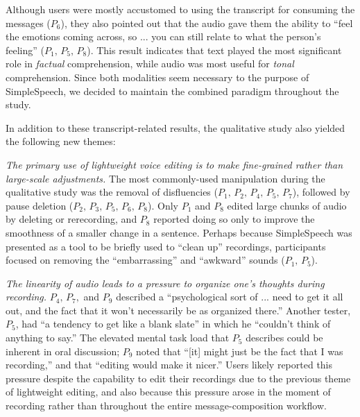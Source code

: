 Although users were mostly accustomed to using the transcript for consuming the messages ($P_6$), they also pointed out that the audio gave them the ability to ``feel the emotions coming across, so ... you can still relate to what the person’s feeling'' ($P_1,\,P_5,\,P_8$).
This result indicates that text played the most significant role in \emph{factual} comprehension, while audio was most useful for \emph{tonal} comprehension.
Since both modalities seem necessary to the purpose of SimpleSpeech, we decided to maintain the combined paradigm throughout the study.

In addition to these transcript-related results, the qualitative study also yielded the following new themes:

\emph{The primary use of lightweight voice editing is to make fine-grained rather than large-scale adjustments.}
The most commonly-used manipulation during the qualitative study was the removal of disfluencies ($P_1,\,P_2,\,P_4,\,P_5,\,P_7$), followed by pause deletion ($P_2,\,P_3,\,P_5,\,P_6,\,P_8$). 
Only $P_1$ and $P_8$ edited large chunks of audio by deleting or rerecording, and $P_8$ reported doing so only to improve the smoothness of a smaller change in a sentence.
Perhaps because SimpleSpeech was presented as a tool to be briefly used to ``clean up'' recordings, participants focused on removing the ``embarrassing'' and ``awkward'' sounds ($P_1,\,P_5$). 

\emph{The linearity of audio leads to a pressure to organize one's thoughts during recording.}
$P_4,\,P_7,$ and $P_9$ described a ``psychological sort of ... need to get it all out, and the fact that it won't necessarily be as organized there.'' 
Another tester, $P_5$, had ``a tendency to get like a blank slate'' in which he ``couldn't think of anything to say.'' 
The elevated mental task load that $P_5$ describes could be inherent in oral discussion; $P_9$ noted that ``[it] might just be the fact that I was recording,'' and that ``editing would make it nicer.'' 
Users likely reported this pressure despite the capability to edit their recordings due to the previous theme of lightweight editing, and also because this pressure arose in the moment of recording rather than throughout the entire message-composition workflow.


